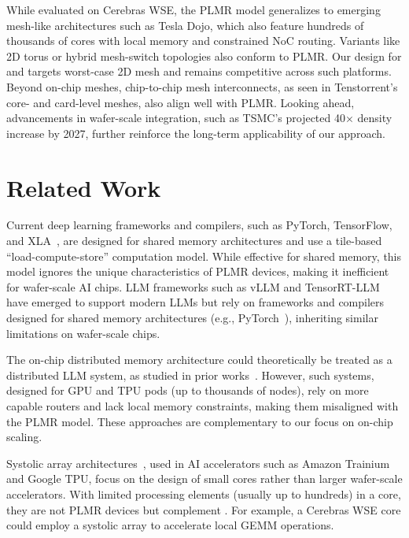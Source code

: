  While evaluated on Cerebras WSE, the PLMR model generalizes to emerging mesh-like architectures such as Tesla Dojo, which also feature hundreds of thousands of cores with local memory and constrained NoC routing. Variants like 2D torus or hybrid mesh-switch topologies also conform to PLMR. Our design for \gemm and \gemv targets worst-case 2D mesh and remains competitive across such platforms. Beyond on-chip meshes, chip-to-chip mesh interconnects, as seen in Tenstorrent’s core- and card-level meshes, also align well with PLMR. Looking ahead, advancements in wafer-scale integration, such as TSMC’s projected 40$\times$ density increase by 2027, further reinforce the long-term applicability of our approach.

\vspace{-0.2cm}
\section{Related Work}
\vspace{-0.2cm}

Current deep learning frameworks and compilers, such as PyTorch, TensorFlow, and XLA~\cite{pytorch, tensorflow, xla,flextensor, tvm, ansor, roller, rammer, welder, ladder}, are designed for shared memory architectures and use a tile-based “load-compute-store” computation model. While effective for shared memory, this model ignores the unique characteristics of PLMR devices, making it inefficient for wafer-scale AI chips. LLM frameworks such as vLLM and TensorRT-LLM~\cite{vllm,tensorrt-llm} have emerged to support modern LLMs but rely on frameworks and compilers designed for shared memory architectures (e.g., PyTorch~\cite{pytorch}), inheriting similar limitations on wafer-scale chips.

 The on-chip distributed memory architecture could theoretically be treated as a distributed LLM system, as studied in prior works~\cite{alpa, alpaserver, vllm, google2023efficiently, tensorrt-llm, loongserve}. However, such systems, designed for GPU and TPU pods (up to thousands of nodes), rely on more capable routers and lack local memory constraints, making them misaligned with the PLMR model. These approaches are complementary to our focus on on-chip scaling.

 Systolic array architectures~\cite{resa}, used in AI accelerators such as Amazon Trainium and Google TPU, focus on the design of small cores rather than larger wafer-scale accelerators. With limited processing elements (usually up to hundreds) in a core, they are not PLMR devices but complement \sys. For example, a Cerebras WSE core could employ a systolic array to accelerate local GEMM operations.

